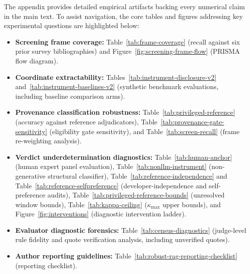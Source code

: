 \noindent The appendix provides detailed empirical artifacts backing every numerical claim in the main text. To assist navigation, the core tables and figures addressing key experimental questions are highlighted below:

\begin{itemize}[leftmargin=1.2em,itemsep=1pt,topsep=2pt]
\item \textbf{Screening frame coverage:}
Table~\ref{tab:frame-coverage} (recall against six prior survey bibliographies) and Figure~\ref{fig:screening-frame-flow} (PRISMA flow diagram).
\item \textbf{Coordinate extractability:}
Tables~\ref{tab:instrument-disclosure-v2} and~\ref{tab:instrument-baselines-v2} (synthetic benchmark evaluations, including baseline comparison arms).
\item \textbf{Provenance classification robustness:}
Table~\ref{tab:privileged-reference} (accuracy against reference adjudicators), Table~\ref{tab:provenance-gate-sensitivity} (eligibility gate sensitivity), and Table~\ref{tab:screen-recall} (frame re-weighting analysis).
\item \textbf{Verdict underdetermination diagnostics:}
Table~\ref{tab:human-anchor} (human expert panel evaluation), Table~\ref{tab:nonllm-instrument} (non-generative structural classifier), Table~\ref{tab:reference-independence} and Table~\ref{tab:reference-selfpreference} (developer-independence and self-preference audits), Table~\ref{tab:privileged-reference-bounds} (unresolved window bounds), Table~\ref{tab:kappa-ceiling} ($\kappa_{\max}$ upper bounds), and Figure~\ref{fig:interventions} (diagnostic intervention ladder).
\item \textbf{Evaluator diagnostic forensics:}
Table~\ref{tab:census-diagnostics} (judge-level rule fidelity and quote verification analysis, including \QFAbsent{} unverified quotes).
\item \textbf{Author reporting guidelines:}
Table~\ref{tab:robust-rag-reporting-checklist} (reporting checklist).
\end{itemize}
